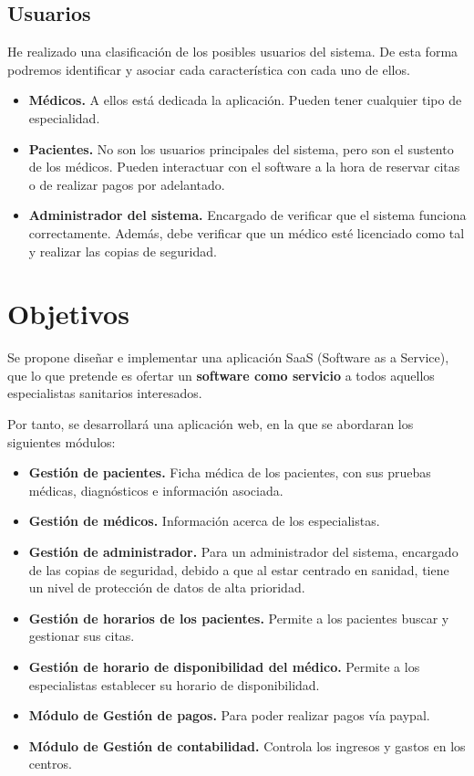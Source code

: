 \documentclass[a4paper,oneside,11pt]{book}
\begin{document}
\subsection {Usuarios}
He realizado una clasificación de los posibles usuarios del sistema. De esta forma podremos identificar y asociar cada característica con cada uno de ellos. 
	
\begin{itemize}
\item \textbf{Médicos.} A ellos está dedicada la aplicación. Pueden tener cualquier tipo de especialidad.
\item \textbf{Pacientes.} No son los usuarios principales del sistema, pero son el sustento de los médicos. Pueden interactuar con el software a la hora de reservar citas o de realizar pagos por adelantado.
\item \textbf{Administrador del sistema.} Encargado de verificar que el sistema funciona correctamente. Además, debe verificar que un médico esté licenciado como tal y realizar las copias de seguridad.
\end{itemize}

\section{Objetivos}
Se propone diseñar e implementar una aplicación SaaS (Software as a Service), que lo que pretende es ofertar un {\bf software como servicio} a todos aquellos especialistas sanitarios interesados. 

	Por tanto, se desarrollará una aplicación web, en la que se abordaran los siguientes módulos:
\begin{itemize}
\item \textbf{Gestión de pacientes.} Ficha médica de los pacientes, con sus pruebas médicas, diagnósticos e información asociada.
\item \textbf{Gestión de médicos.} Información acerca de los especialistas.
\item \textbf{Gestión de administrador.} Para un administrador del sistema, encargado de las copias de seguridad, debido a que al estar centrado en sanidad, tiene un nivel de protección de datos de alta prioridad.
\item \textbf{Gestión de horarios de los pacientes.} Permite a los pacientes buscar y gestionar sus citas.
\item \textbf{Gestión de horario de disponibilidad del médico.} Permite a los especialistas establecer su horario de disponibilidad.
\item \textbf{Módulo de Gestión de pagos.} Para poder realizar pagos vía paypal.
\item \textbf{Módulo de Gestión de contabilidad.} Controla los ingresos y gastos en los centros.
\end{itemize}
\end{document}

